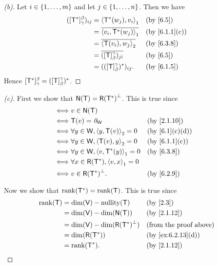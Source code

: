 \begin{proof}[(b)]
  Let \(i \in \left\lbrace1, \dots, m\right\rbrace\) and let \(j \in \left\lbrace1, \dots, n\right\rbrace\).
  Then we have
  \begin{align*}
    ([\T^*]_{\gamma}^{\beta})_{i j} & = \inn{\T^*(w_j), v_i}_1               &  & \by{6.5}      \\
                                    & = \conj{\inn{v_i, \T^*(w_j)}_1}        &  & \by{6.1.1}[c] \\
                                    & = \conj{\inn{\T(v_i), w_j}_2}          &  & \by{6.3.8}    \\
                                    & = \conj{([\T]_{\beta}^{\gamma})_{j i}} &  & \by{6.5}      \\
                                    & = (([\T]_{\beta}^{\gamma})^*)_{i j}.   &  & \by{6.1.5}
  \end{align*}
  Hence \([\mathsf{T}^*]_{\gamma}^{\beta} = ([\mathsf{T}]_{\beta}^{\gamma})^*\).
\end{proof}

\begin{proof}[(c)]
  First we show that \(\ns{\T} = \rg{\T^*}^{\perp}\).
  This is true since
  \begin{align*}
    \iff & v \in \ns{\T}                                                \\
    \iff & \T(v) = \zv_{\W}                          &  & \by{2.1.10}   \\
    \iff & \forall y \in \W, \inn{y, \T(v)}_2 = 0    &  & \by{6.1}[c,d] \\
    \iff & \forall y \in \W, \inn{\T(v), y}_2 = 0    &  & \by{6.1.1}[c] \\
    \iff & \forall y \in \W, \inn{v, \T^*(y)}_1 = 0  &  & \by{6.3.8}    \\
    \iff & \forall x \in \rg{\T^*}, \inn{v, x}_1 = 0                    \\
    \iff & v \in \rg{\T^*}^{\perp}.                  &  & \by{6.2.9}
  \end{align*}

  Now we show that \(\rk{\T^*} = \rk{\T}\).
  This is true since
  \begin{align*}
    \rk{\T} & = \dim(\V) - \nt{\T}                 &  & \by{2.3}                      \\
            & = \dim(\V) - \dim(\ns{\T})           &  & \by{2.1.12}                   \\
            & = \dim(\V) - \dim(\rg{\T^*}^{\perp}) &  & \text{(from the proof above)} \\
            & = \dim(\rg{\T^*})                    &  & \by{ex:6.2.13}[d]             \\
            & = \rk{\T^*}.                         &  & \by{2.1.12}
  \end{align*}
\end{proof}


